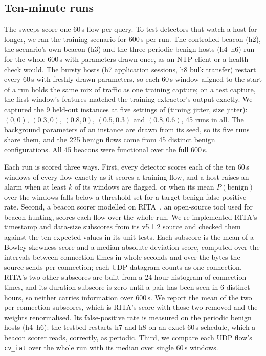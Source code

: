 \documentclass[preprint,12pt]{elsarticle}
\begin{document}
\subsection{Ten-minute runs}
\label{sec:long-method}
The sweeps score one 60\,s flow per query. To test detectors that watch a host for longer, we ran the
training scenario for 600\,s per run. The controlled beacon (h2), the scenario's own beacon (h3) and
the three periodic benign hosts (h4--h6) run for the whole 600\,s with parameters drawn once, as an NTP
client or a health check would. The bursty hosts (h7 application sessions, h8 bulk transfer) restart
every 60\,s with freshly drawn parameters, so each 60\,s window aligned to the start of a run holds the
same mix of traffic as one training capture; on a test capture, the first window's features matched the
training extractor's output exactly. We captured the 9 held-out instances at five settings of (timing
jitter, size jitter): $(0, 0)$, $(0.3, 0)$, $(0.8, 0)$, $(0.5, 0.3)$ and $(0.8, 0.6)$, 45 runs in all.
The background parameters of an instance are drawn from its seed, so its five runs share them, and the
225 benign flows come from 45 distinct benign configurations. All 45 beacons were functional over the
full 600\,s.

Each run is scored three ways. First, every detector scores each of the ten 60\,s windows of every flow
exactly as it scores a training flow, and a host raises an alarm when at least $k$ of its windows are
flagged, or when its mean $P(\text{benign})$ over the windows falls below a threshold set for a target
benign false-positive rate. Second, a beacon scorer modelled on RITA~\cite{rita2026}, an open-source
tool used for beacon hunting, scores each flow over the whole run. We re-implemented RITA's timestamp and
data-size subscores from its v5.1.2 source and checked them against the ten expected values in its unit
tests. Each subscore is the mean of a Bowley-skewness score and a median-absolute-deviation score,
computed over the intervals between connection times in whole seconds and over the bytes the source
sends per connection; each UDP datagram counts as one connection. RITA's two other subscores are built
from a 24-hour histogram of connection times, and its duration subscore is zero until a pair has been
seen in 6 distinct hours, so neither carries information over 600\,s. We report the mean of the two
per-connection subscores, which is RITA's score with those two removed and the weights renormalised.
Its false-positive rate is measured on the periodic benign hosts (h4--h6): the testbed restarts h7 and
h8 on an exact 60\,s schedule, which a beacon scorer reads, correctly, as periodic. Third, we compare
each UDP flow's \texttt{cv\_iat} over the whole run with its median over single 60\,s windows.
\end{document}
